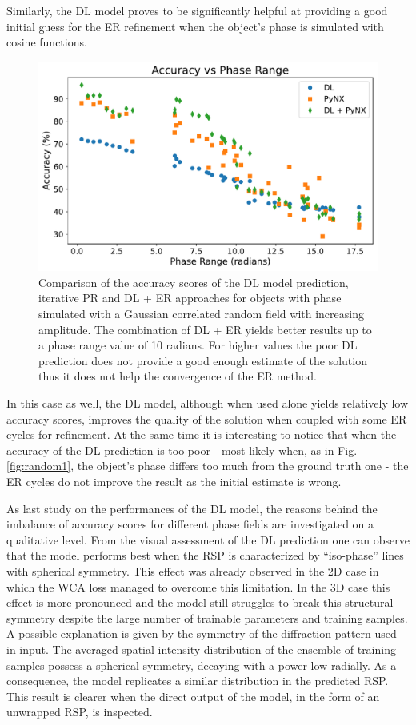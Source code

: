 Similarly, the DL model proves to be significantly helpful at providing a good initial guess for the ER refinement when 
the object's phase is simulated with cosine functions. 

\begin{figure}[H]
    \centering
    \includegraphics[width=\textwidth]{figures/Phasing/plot_acc_comparison.pdf}
    \caption{Comparison of the accuracy scores of the DL model prediction, iterative PR and DL + ER approaches for objects with 
    phase simulated with a Gaussian correlated random field with increasing amplitude. The combination of DL + ER yields better 
    results up to a phase range value of 10 radians. For higher values the poor DL prediction does not provide a good enough 
    estimate of the solution thus it does not help the convergence of the ER method. }
    \label{fig:compare_random}
\end{figure}

In this case as well, the DL model, although when used alone yields relatively low accuracy scores, improves the quality of the 
solution when coupled with some ER cycles for refinement. At the same time it is interesting to notice that when the 
accuracy of the DL prediction is too poor - most likely when, as in Fig.\ref{fig:random1}, the object's phase differs too 
much from the ground truth one - the ER cycles do not improve the result as the initial estimate is wrong. 

As last study on the performances of the DL model, the reasons behind the imbalance of accuracy scores for different phase 
fields are investigated on a qualitative level. From the visual assessment of the DL prediction one can observe that 
the model performs best when the RSP is characterized by ``iso-phase'' lines with spherical symmetry. This effect was 
already observed in the 2D case in which the WCA loss managed to overcome this limitation. In the 3D case this effect is 
more pronounced and the model still struggles to break this structural symmetry despite the large number of trainable parameters 
and training samples. A possible explanation is given by the symmetry of the diffraction pattern used in input. The averaged 
spatial intensity distribution of the ensemble of training samples possess a spherical symmetry, decaying with a power 
low radially. As a consequence, the model replicates a similar distribution in the predicted RSP. This result is clearer 
when the direct output of the model, in the form of an unwrapped RSP, is inspected. 

